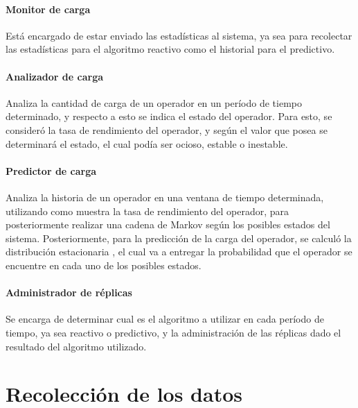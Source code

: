 \paragraph{Monitor de carga} Está encargado de estar enviado las estadísticas al sistema, ya sea para recolectar las estadísticas para el algoritmo reactivo como el historial para el predictivo.

\paragraph{Analizador de carga} Analiza la cantidad de carga de un operador en un período de tiempo determinado, y respecto a esto se indica el estado del operador. Para esto, se consideró la tasa de rendimiento del operador, y según el valor que posea se determinará el estado, el cual podía ser ocioso, estable o inestable.

\paragraph{Predictor de carga} %
Analiza la historia de un operador en una ventana de tiempo determinada, utilizando como muestra la tasa de rendimiento del operador, para posteriormente realizar una cadena de Markov según los posibles estados del sistema. Posteriormente, para la predicción de la carga del operador, se calculó la distribución estacionaria \citep{Papoulis1984}, el cual va a entregar la probabilidad que el operador se encuentre en cada uno de los posibles estados.

\paragraph{Administrador de réplicas} Se encarga de determinar cual es el algoritmo a utilizar en cada período de tiempo, ya sea reactivo o predictivo, y la administración de las réplicas dado el resultado del algoritmo utilizado.

\section{Recolección de los datos}

